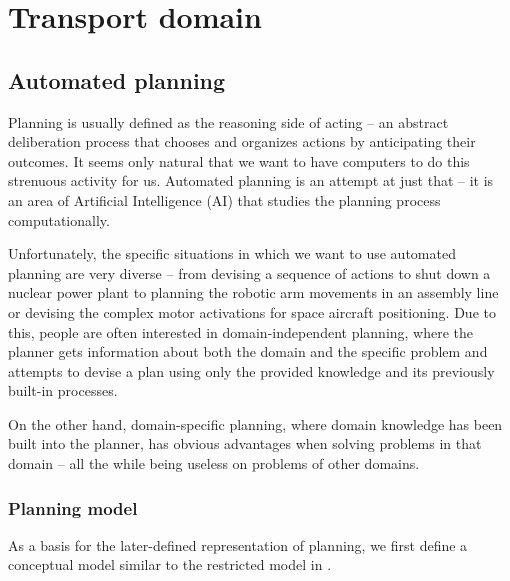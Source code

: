 \chapter{Transport domain}

\section{Automated planning}

Planning is usually defined as the reasoning side of acting -- an abstract deliberation
process that chooses and organizes actions by anticipating their outcomes. \cite[Section~1.1]{Ghallab2004}
It seems only natural that we want to have computers to do this strenuous activity for us.
Automated planning is an attempt at just that -- it is an area of Artificial Intelligence (AI) that
studies the planning process computationally. \cite[Section~1.1]{Ghallab2004}


Unfortunately, the specific situations in which we want to use automated planning are very diverse --
from devising a sequence of actions to shut down a nuclear power plant to planning the robotic arm
movements in an assembly line or devising the complex motor activations for space aircraft positioning.
Due to this, people are often interested in domain-independent planning, where the planner gets information
about both the domain and the specific problem and attempts to devise a plan using only the provided knowledge
and its previously built-in processes. \cite[Section~1.3]{Ghallab2004}

On the other hand, domain-specific planning, where domain knowledge has been built into the planner,
has obvious advantages when solving problems in that domain -- all the while being useless on problems of other
domains. \cite[Section~1.3]{Ghallab2004}

\subsection{Planning model}

As a basis for the later-defined representation of planning, we first define
a conceptual model similar to the restricted model in \cite[Section~1.4, Section~1.5]{Ghallab2004}.

